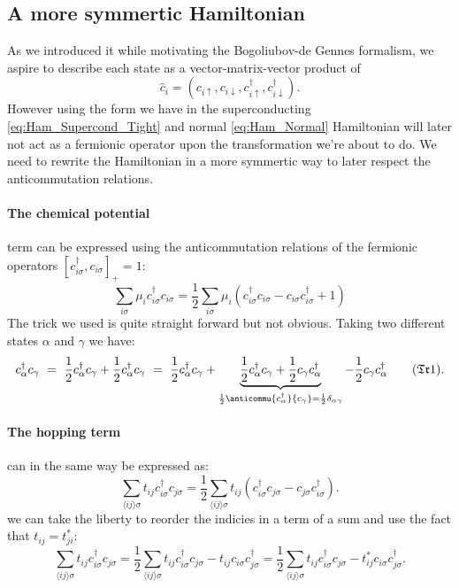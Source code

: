 \documentclass[../main.tex]{subfile}
\begin{document}
\subsection{A more symmertic Hamiltonian}
As we introduced it while motivating the Bogoliubov-de Gennes formalism, we aspire to describe each state as a vector-matrix-vector product of
\[
    \hat{c}_i = \left(c_{i\uparrow}, c_{i\downarrow},c_{i\uparrow}^{\dagger}, c_{i\downarrow}^{\dagger}\right).
\]
However using the form we have in the superconducting \ref{eq:Ham_Supercond_Tight} and normal \ref{eq:Ham_Normal} 
Hamiltonian will later not act as a fermionic operator upon the transformation we're about to
do. We need to rewrite the Hamiltonian in a more symmertic way to later respect the anticommutation relations.\\

\paragraph{The chemical potential} term can be expressed using the anticommutation relations of the fermionic operators $[c_{i\sigma}^{\dagger},c_{i\sigma}]_+ = 1$:
\begin{equation}\label{eq:SymHam_muTerm}
    \sum_{i\sigma} \mu_i c_{i\sigma}^{\dagger} c_{i\sigma} = \frac{1}{2}\sum_{i\sigma} \mu_i \left(c_{i\sigma}^{\dagger}c_{i\sigma} - c_{i\sigma}c_{i\sigma}^{\dagger} + 1\right)
\end{equation}
The trick we used is quite straight forward but not obvious. Taking two different states $\alpha$ and $\gamma$ we have:
\[
    c^{\dagger}_{\alpha}c_{\gamma} ~=~ \frac{1}{2}c^{\dagger}_{\alpha}c_{\gamma} + \frac{1}{2}c^{\dagger}_{\alpha}c_{\gamma} ~=~ \frac{1}{2}c^{\dagger}_{\alpha}c_{\gamma} + \underbrace{\frac{1}{2}c^{\dagger}_{\alpha}c_{\gamma} + \frac{1}{2}c_{\gamma}c^{\dagger}_{\alpha}}_{\frac{1}{2}\anticommu{c^{\dagger}_{\alpha}}{c_{\gamma}} = \frac{1}{2}\delta_{\alpha\gamma}} - \frac{1}{2}c_{\gamma}c^{\dagger}_{\alpha} \tag{$\mathfrak{Tr}$1}. \label{eq:Trick1}
\]
\paragraph{The hopping term} can in the same way be expressed as:
\[
    \sum_{\langle ij\rangle\sigma} t_{ij} c_{i\sigma}^{\dagger} c_{j\sigma} = \frac{1}{2}\sum_{\langle ij\rangle \sigma} t_{ij} \left(c_{i\sigma}^{\dagger}c_{j\sigma} - c_{j\sigma}c_{i\sigma}^{\dagger}\right).
\]
we can take the liberty to reorder the indicies in a term of a sum and use the fact that $t_{ij} = t_{ji}^{\ast}$:
\begin{equation}\label{eq:SymHam_tij}
    \sum_{\langle ij\rangle\sigma} t_{ij} c_{i\sigma}^{\dagger} c_{j\sigma} = \frac{1}{2}\sum_{\langle ij\rangle \sigma} t_{ij}c_{i\sigma}^{\dagger}c_{j\sigma} - t_{ij}c_{i\sigma}c_{j\sigma}^{\dagger} = \frac{1}{2}\sum_{\langle ij\rangle \sigma} t_{ij}c_{i\sigma}^{\dagger}c_{j\sigma} - t_{ij}^{\ast}c_{i\sigma}c_{j\sigma}^{\dagger}.
\end{equation}
\end{document}

